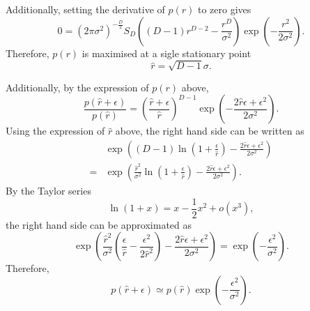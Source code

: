 Additionally, setting the derivative of $p(r)$ to zero gives
%
\begin{equation}
0 
= 
(2 \pi \sigma ^ 2) ^ {- \frac{D}{2}} 
S_D 
\left( 
	(D - 1) r ^ {D - 2} 
	- 
	\frac{r ^ D}{\sigma ^ 2} 
\right) 
\exp 
\left( 
	- 
	\frac{r ^ 2}{2 \sigma ^2} 
\right).
\end{equation}
%
Therefore, $p(r)$ is maximised at a sigle stationary point
%
\begin{equation}
\hat{r} 
= 
\sqrt{D - 1} 
\sigma.
\end{equation}
%

Additionally, by the expression of $p(r)$ above,
%
\begin{equation}
\frac{p 
\left( 
	\hat{r} 
	+ 
	\epsilon 
\right)}
{p(\hat{r})} 
= 
\left( 
	\frac{\hat{r} + \epsilon}{\hat{r}} 
\right) ^ {D - 1} 
\exp 
\left( 
	- 
	\frac{2 \hat{r} \epsilon + \epsilon ^ 2}{2 \sigma ^ 2} 
\right).
\end{equation}
%
Using the expression of $\hat{r}$ above, the right hand side can be written as
%
\begin{equation}
\begin{aligned}
&
\exp 
\left( 
	(D - 1) 
	\ln 
	\left( 
		1 
		+ 
		\frac{\epsilon}{\hat{r}} 
	\right) 
	- 
	\frac{2 \hat{r} \epsilon + \epsilon ^ 2}{2 \sigma ^ 2} 
\right) 
\\
=& 
\exp 
\left( 
	\frac{\hat{r} ^ 2}{\sigma ^ 2} 
	\ln 
	\left( 
		1 
		+ 
		\frac{\epsilon}{\hat{r}} 
	\right) 
	- 
	\frac{2 \hat{r} \epsilon + \epsilon ^ 2}{2 \sigma ^ 2} 
\right).
\end{aligned}
\end{equation}
%
By the Taylor series
%
\begin{equation}
\ln (1 + x) 
= 
x 
- 
\frac{1}{2} x ^ 2 
+ 
o \left( x ^ 3 \right),
\end{equation}
%
the right hand side can be approximated as
%
\begin{equation}
\exp 
\left( 
	\frac{\hat{r} ^ 2}{\sigma ^ 2} 
	\left( 
		\frac{\epsilon}{\hat{r}} 
		- 
		\frac{\epsilon ^ 2}{2 {\hat{r}} ^ 2} 
	\right) 
	- 
	\frac{2 \hat{r} \epsilon + \epsilon ^ 2}{2 \sigma ^ 2} 
\right) 
= 
\exp 
\left( 
	- 
	\frac{\epsilon ^ 2}{\sigma ^ 2} 
\right).
\end{equation}
%
Therefore,
%
\begin{equation}
p 
\left( 
	\hat{r} 
	+ 
	\epsilon 
\right) 
\simeq 
p 
\left( 
	\hat{r} 
\right) 
\exp 
\left( 
	- 
	\frac{\epsilon ^ 2}{\sigma ^ 2} 
\right).
\end{equation}
%

